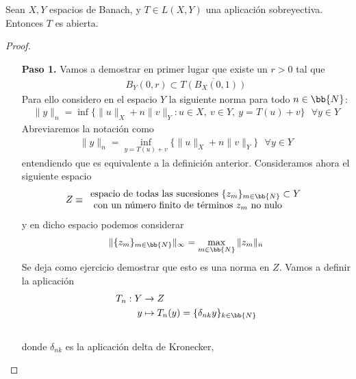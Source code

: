 \begin{teo}
    Sean $X,Y$ espacios de Banach, y $T\in L(X,Y)$ una aplicación sobreyectiva. Entonces $T$ es abierta.
    \begin{proof}\
        \begin{itemize}
            \item[\textbf{Paso 1.}] Vamos a demostrar en primer lugar que existe un $r>0$ tal que
            \begin{gather*}
                B_Y(0,r)\subset \overline{T(B_X(0,1))}
            \end{gather*}
            Para ello considero en el espacio $Y$ la siguiente norma para todo $n\in \bb{N}$:
            \begin{gather*}
                \|y\|_n = \inf\{\|u\|_X+n \|v\|_Y: u\in X,\ v\in Y, \ y=T(u)+v\}\ \ \ \forall y \in Y
            \end{gather*}
            Abreviaremos la notación como 
            \begin{gather*}
                \|y\|_n = \inf_{y=T(u)+v}\{\|u\|_X+n \|v\|_Y\}\ \ \ \forall y \in Y
            \end{gather*}
            entendiendo que es equivalente a la definición anterior. Consideramos ahora el siguiente espacio
            \begin{gather*}
                Z \equiv 
                \begin{array}{l}
                    \text{espacio de todas las sucesiones } \{z_m\}_{m\in \bb{N}}\subset Y\\
                    \text{ con un número finito de términos } z_m \text{ no nulo}
                \end{array}
            \end{gather*}
            y en dicho espacio podemos considerar
            \begin{gather*}
                \|\{z_m\}_{m\in \bb{N}}\|_\infty = \max_{m\in \bb{N}} \|z_m\|_n
            \end{gather*}
            Se deja como ejercicio demostrar que esto es una norma en $Z$. Vamos a definir la aplicación
            \begin{align*}
                T_n : Y &\to Z\\
                y &\mapsto T_n(y) = \{\delta_{nk}y\}_{k\in \bb{N}}\\\\
            \end{align*}
            donde $\delta_{nk}$ es la aplicación delta de Kronecker,

\end{itemize}
\end{proof}
\end{teo}
